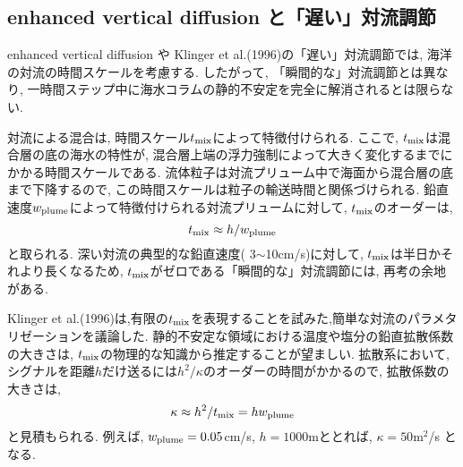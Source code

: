 \subsection{enhanced vertical diffusion と「遅い」対流調節}
enhanced vertical diffusion や Klinger et al.(1996)の「遅い」対流調節では,
海洋の対流の時間スケールを考慮する.
したがって, 「瞬間的な」対流調節とは異なり, 一時間ステップ中に海水コラムの静的不安定を完全に解消されるとは限らない.

対流による混合は, 時間スケール$t_{\rm mix}$によって特徴付けられる.
ここで, $t_{\rm mix}$は混合層の底の海水の特性が, 混合層上端の浮力強制によって大きく変化するまでにかかる時間スケールである.
流体粒子は対流プリューム中で海面から混合層の底まで下降するので,
この時間スケールは粒子の輸送時間と関係づけられる.
鉛直速度$w_{\rm plume}$によって特徴付けられる対流プリュームに対して,
$t_{\rm mix}$のオーダーは, 
\begin{equation}
  t_{\rm mix} \approx h/w_{\rm plume}
\end{equation}
と取られる.
深い対流の典型的な鉛直速度( 3$\sim$10cm/s)に対して, $t_{\rm mix}$は半日かそれより長くなるため,
$t_{\rm mix}$がゼロである「瞬間的な」対流調節には, 再考の余地がある. 

Klinger et al.(1996)は,有限の$t_{\rm mix}$を表現することを試みた,簡単な対流のパラメタリゼーションを議論した.
静的不安定な領域における温度や塩分の鉛直拡散係数の大きさは, $t_{\rm mix}$の物理的な知識から推定することが望ましい.
拡散系において, シグナルを距離$h$だけ送るには$h^2/\kappa$のオーダーの時間がかかるので,
拡散係数の大きさは, 
 \begin{equation}
  \kappa \approx h^2/t_{\rm mix} = h w_{\rm plume}
   \label{eq:vertical_diffusivity}
 \end{equation}
 と見積もられる.
 例えば, $w_{\rm plume}=0.05$cm/s, $h=1000$mととれば, $\kappa=50$m$^2$/s となる.

